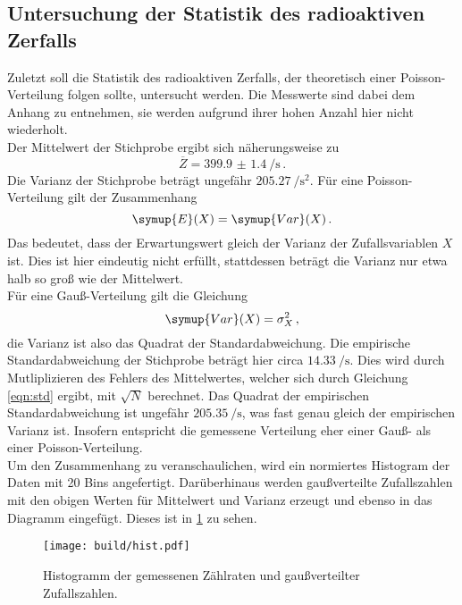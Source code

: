 \subsection{Untersuchung der Statistik des radioaktiven Zerfalls}
\label{subsec:statistik}
Zuletzt soll die Statistik des radioaktiven Zerfalls, der theoretisch einer Poisson-Verteilung folgen sollte,
untersucht werden. Die Messwerte sind dabei dem Anhang zu entnehmen, sie werden aufgrund ihrer
hohen Anzahl hier nicht wiederholt. \\
Der Mittelwert der Stichprobe ergibt sich näherungsweise zu
\begin{equation*}
  \overline{Z} = \SI{399.9(14)}{\per\second}\,.
\end{equation*}
Die Varianz der Stichprobe beträgt ungefähr $\SI{205.27}{\per\second\squared}$.
Für eine Poisson-Verteilung gilt der Zusammenhang
\begin{equation*}
	\symup{E}(X) = \symup{Var}(X)\,.
\end{equation*}
Das bedeutet, dass der Erwartungswert gleich der Varianz der Zufallsvariablen $X$
ist. Dies ist hier eindeutig nicht erfüllt, stattdessen beträgt die Varianz nur etwa halb so groß wie der Mittelwert.\\
Für eine Gauß-Verteilung gilt die Gleichung
\begin{equation*}
	\symup{Var}(X) = \sigma_X^2\,,
\end{equation*}
die Varianz ist also das Quadrat der Standardabweichung. Die empirische Standardabweichung
der Stichprobe beträgt hier circa $\SI{14.33}{\per\second}$. Dies wird durch Mutliplizieren
des Fehlers des Mittelwertes, welcher sich durch Gleichung \eqref{eqn:std} ergibt, mit $\sqrt{N}$ berechnet.
Das Quadrat der empirischen Standardabweichung ist ungefähr $\SI{205.35}{\per\second}$, was
fast genau gleich der empirischen Varianz ist. Insofern entspricht die gemessene Verteilung
eher einer Gauß- als einer Poisson-Verteilung.\\
Um den Zusammenhang zu veranschaulichen, wird ein normiertes Histogram der Daten
mit 20 Bins angefertigt. Darüberhinaus werden gaußverteilte Zufallszahlen mit den obigen
Werten für Mittelwert und Varianz erzeugt und ebenso in das Diagramm eingefügt.
Dieses ist in \ref{fig:hist} zu sehen.

\begin{figure}
  \centering
  \texttt{[image: build/hist.pdf]}
  \caption{Histogramm der gemessenen Zählraten und gaußverteilter Zufallszahlen.}
  \label{fig:hist}
\end{figure}
